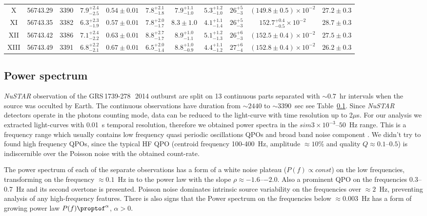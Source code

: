 \documentclass[a4paper,fleqn,usenatbib]{mnras}
\def\grs{{GRS\,1739-278\,}}
\begin{document}
\begin{table}
\begin{tabular}{|c|c|c|c|c|c|c|c|c|c|c|}
X & 56743.29  & 3390 & $7.9_{-2.5}^{+2.4}$ & $0.54\pm0.01$ & $7.8_{-1.8}^{+2.1}$ & $7.9_{-1.0}^{+1.1}$ & $5.3_{-1.0}^{+1.2}$ & $26_{-3}^{+5}$ & $(149.8\pm0.5)\times10^{-2}$ & $27.2\pm0.3$ \\
XI & 56743.35 & 3382 & $6.3_{-1.9}^{+2.3}$ & $0.57\pm0.01$ & $7.8_{-1.7}^{+2.0}$ & $8.3\pm1.0$ & $4.1_{-1.4}^{+1.1}$ & $26_{-3}^{+5}$ & $152.7_{-0.5}^{+0.4}\times10^{-2}$ & $28.7\pm0.3$ \\
XII & 56743.42 & 3386 & $7.1_{-2.2}^{+2.4}$ & $0.63\pm0.01$ & $8.8_{-1.7}^{+2.7}$ & $8.9_{-1.1}^{+1.0}$ & $5.1_{-1.3}^{+1.2}$ & $26_{-3}^{+6}$ & $(152.5\pm0.4)\times10^{-2}$ & $27.5\pm0.3$ \\
XIII &  56743.49 & 3391 & $6.8_{-2.1}^{+2.2}$ & $0.67\pm0.01$ & $6.5_{-1.4}^{+2.0}$ & $8.8_{-0.9}^{+1.0}$ & $4.4_{-1.2}^{+1.1}$ & $27_{-4}^{+6}$ & $(152.8\pm0.4)\times10^{-2}$ & $26.2\pm0.3$ \\
\hline
\end{tabular}
\end{table}
\subsection{Power spectrum}
    {\it NuSTAR} observation of the \grs\ 2014 outburst are split on 13 continuous parts separated with $\sim0.7$~hr intervals when the source was occulted by Earth. 
    The continuous observations have duration from $\sim2440$ to $\sim3390$~sec see Table~\ref{}.
    Since {\it NuSTAR} detectors operate in the photons counting mode, data can be reduced to the light-curve with time resolution up to 2$\mu$s.
    For our analysis we extracted light-curves with 0.01~s temporal resolution, therefore we obtained power spectra in the $sim3\times10^{-3}$--$50$~Hz range.
    This is a frequency range which usually contains low frequency quasi periodic oscillations QPOs and broad band noise component \citep{1999ApJ...514..939W}.
    We didn't try to found high frequency QPOs, since the typical HF QPO (centroid frequency 100-400~Hz, amplitude $\approx10$\% and quality $Q\approx0.1$--$0.5$) is indiscernible over the Poisson noise with the obtained count-rate.

    The power spectrum of each of the separate observations has a form of a white noise plateau ($P(f)\propto const$) on the low frequencies, transforming on the frequency $\approx0.1$~Hz in to the power law with the slope $\rho\approx-1.6$--$-2.0$. 
    Also a prominent QPO on the frequencies 0.3--0.7~Hz and its second overtone is presented.
    Poisson noise dominates intrinsic source variability on the frequencies over $\approx2$~Hz, preventing analysis of any high-frequency features. %
    There is also signs that the Power spectrum on the frequencies below $\approx0.003$~Hz has a form of growing power law $P(f)\proptof^{\alpha}$, $\alpha > 0$.
\end{document}
